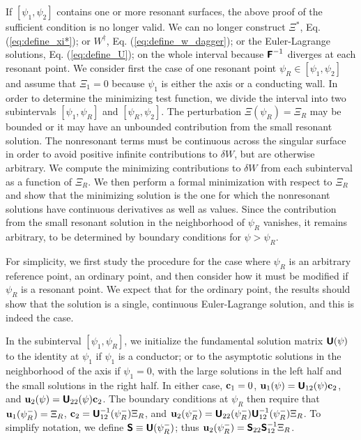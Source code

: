 \documentclass[prb,twocolumn,showpacs,preprintnumbers,amsmath,amssymb]{revtex4}
\renewcommand*{\v}[1]{\hbox{\bfseries #1}}
\renewcommand*{\t}[1]{\hbox{\sffamily\bfseries #1}}
\begin{document}
If $[\psi_1,\psi_2]$ contains one or more resonant surfaces, the above
proof of the sufficient condition is no longer valid.  We can no longer
construct $\Xi^*$, Eq. (\ref{eq:define_xi*}); or $W^\dagger$,
Eq. (\ref{eq:define_w_dagger}); or the Euler-Lagrange solutions,
Eq. (\ref{eq:define_U}); on the whole interval because $\t{F}^{-1}$
diverges at each resonant point.  We consider first the case of one
resonant point $\psi_R \in [\psi_1,\psi_2]$ and assume that $\Xi_1=0$
because $\psi_1$ is either the axis or a conducting wall.  In order to
determine the minimizing test function, we divide the interval into two
subintervals $[\psi_1,\psi_R]$ and $[\psi_R,\psi_2]$.  The perturbation
$\Xi(\psi_R) = \Xi_R$ may be bounded or it may have an unbounded
contribution from the small resonant solution.  The nonresonant terms
must be continuous across the singular surface in order to avoid
positive infinite contributions to $\delta W$, but are otherwise
arbitrary.  We compute the minimizing contributions to $\delta W$ from
each subinterval as a function of $\Xi_R$.  We then perform a formal
minimization with respect to $\Xi_R$ and show that the minimizing
solution is the one for which the nonresonant solutions have continuous
derivatives as well as values.  Since the contribution from the small
resonant solution in the neighborhood of $\psi_R$ vanishes, it remains
arbitrary, to be determined by boundary conditions for $\psi > \psi_R$.

For simplicity, we first study the procedure for the case where $\psi_R$
is an arbitrary reference point, an ordinary point, and then consider
how it must be modified if $\psi_R$ is a resonant point.  We expect that
for the ordinary point, the results should show that the solution is a
single, continuous Euler-Lagrange solution, and this is indeed the case.

In the subinterval $[\psi_1,\psi_R]$, we initialize the fundamental
solution matrix $\t{U}(\psi)$ to the identity at $\psi_1$ if $\psi_1$ is
a conductor; or to the asymptotic solutions in the neighborhood of the
axis if $\psi_1=0$, with the large solutions in the left half and the
small solutions in the right half.  In either case, $\v{c}_1=0$,
$\v{u}_1(\psi) = \t{U}_{12}(\psi)\v{c}_2$, and $\v{u}_2(\psi) =
\t{U}_{22}(\psi) \v{c}_2$.  The boundary conditions at $\psi_R$ then
require that $\v{u}_1(\psi_R^-) = \Xi_R$, $\v{c}_2 =
\t{U}_{12}^{-1}(\psi_R^-) \Xi_R$, and $\v{u}_2(\psi_R^-) =
\t{U}_{22}(\psi_R^-)\t{U}_{12}^{-1}(\psi_R^-) \Xi_R$.  To simplify
notation, we define $\t{S} \equiv \t{U}(\psi_R^-)$; thus
$\v{u}_2(\psi_R^-) = \t{S}_{22} \t{S}_{12}^{-1} \Xi_R$.
\end{document}
